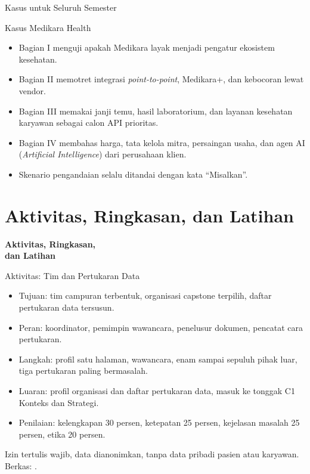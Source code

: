 \documentclass[aspectratio=169, table, 12pt]{beamer}
\begin{document}
\begin{frame}{{\Large Kasus untuk Seluruh Semester}}
  \begin{block}{Kasus Medikara Health}
    \small
    \begin{itemize}
      \item Bagian I menguji apakah Medikara layak menjadi pengatur ekosistem kesehatan.
      \item Bagian II memotret integrasi \textit{point-to-point}, Medikara+, dan kebocoran lewat vendor.
      \item Bagian III memakai janji temu, hasil laboratorium, dan layanan kesehatan karyawan sebagai calon API prioritas.
      \item Bagian IV membahas harga, tata kelola mitra, persaingan usaha, dan agen AI (\textit{Artificial Intelligence}) dari perusahaan klien.
      \item Skenario pengandaian selalu ditandai dengan kata ``Misalkan''.
    \end{itemize}
  \end{block}
\end{frame}

\section{Aktivitas, Ringkasan, dan Latihan}

\begin{frame}{\hfill}
  \centering
  \Huge{\textbf{Aktivitas, Ringkasan,\\dan Latihan}}
\end{frame}

\begin{frame}{{\Large Aktivitas: Tim dan Pertukaran Data}}
  \begin{itemize}
    \item Tujuan: tim campuran terbentuk, organisasi capstone terpilih, daftar pertukaran data tersusun.
    \item Peran: koordinator, pemimpin wawancara, penelusur dokumen, pencatat cara pertukaran.
    \item Langkah: profil satu halaman, wawancara, enam sampai sepuluh pihak luar, tiga pertukaran paling bermasalah.
    \item Luaran: profil organisasi dan daftar pertukaran data, masuk ke tonggak C1 Konteks dan Strategi.
    \item Penilaian: kelengkapan 30 persen, ketepatan 25 persen, kejelasan masalah 25 persen, etika 20 persen.
  \end{itemize}
  \vspace{2pt}
  {\footnotesize Izin tertulis wajib, data dianonimkan, tanpa data pribadi pasien atau karyawan. Berkas: .\par}
\end{frame}
\end{document}
